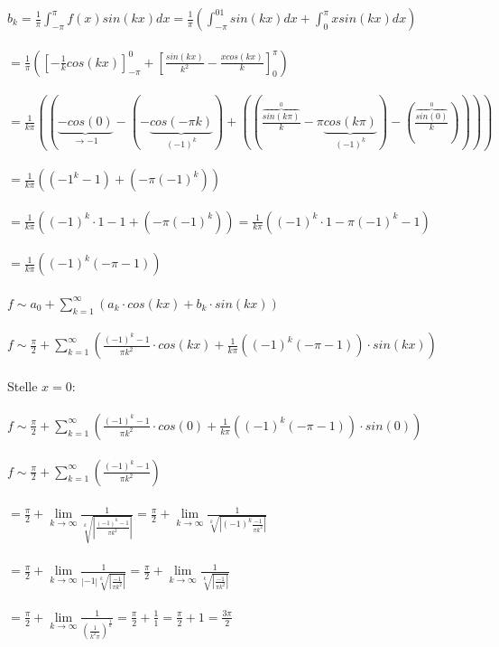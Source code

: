 \documentclass[12pt,a4paper]{article}
\begin{document}
$b_k=\frac{1}{\pi}\int_{-\pi}^\pi f(x)sin(kx)dx = \frac{1}{\pi}(\int_{-\pi}^01sin(kx)dx+\int_0^\pi xsin(kx)dx)$\\
\\
$=\frac{1}{\pi}(\left[-\frac{1}{k}cos(kx)\right]_{-\pi}^0+\left[\frac{sin(kx)}{k^2}-\frac{xcos(kx)}{k}\right]_0^\pi)$\\
\\
$=\frac{1}{k\pi}((\underbrace{-cos(0)}_{\rightarrow -1}-(-\underbrace{cos(-\pi k)}_{(-1)^k})+((\frac{\overbrace{sin(k\pi)}^{0}}{k}-\pi \underbrace{cos(k\pi)}_{(-1)^k})-(\frac{\overbrace{sin(0)}^{0}}{k}))))$\\
\\
$=\frac{1}{k\pi}((-1^k-1)+(-\pi (-1)^k))$\\
\\
$=\frac{1}{k\pi}((-1)^k\cdot 1-1+(-\pi (-1)^k)) = \frac{1}{k\pi}((-1)^k\cdot 1-\pi (-1)^k-1)$\\
\\
$=\frac{1}{k\pi}((-1)^k(-\pi-1))$\\
\\
$f\sim a_0+\sum_{k=1}^\infty(a_k\cdot cos(kx)+b_k\cdot sin(kx))$\\
\\
$f\sim \frac{\pi}{2}+\sum_{k=1}^\infty(\frac{(-1)^k-1}{\pi k^2}\cdot cos(kx)+\frac{1}{k\pi}((-1)^k(-\pi-1))\cdot sin(kx))$\\
\\
Stelle $x=0:$\\
\\
$f\sim \frac{\pi}{2}+\sum_{k=1}^\infty(\frac{(-1)^k-1}{\pi k^2}\cdot cos(0)+\frac{1}{k\pi}((-1)^k(-\pi-1))\cdot sin(0))$\\
\\
$f\sim \frac{\pi}{2}+\sum_{k=1}^\infty(\frac{(-1)^k-1}{\pi k^2})$\\
\\
$= \frac{\pi}{2}+\lim \limits_{k\rightarrow \infty}\frac{1}{\sqrt[k]{|\frac{(-1)^k-1}{\pi k^2}|}}= \frac{\pi}{2}+\lim \limits_{k\rightarrow \infty}\frac{1}{\sqrt[k]{|(-1)^k\frac{-1}{\pi k^2}|}}$\\
\\
$= \frac{\pi}{2}+\lim \limits_{k\rightarrow \infty}\frac{1}{|-1|\sqrt[k]{|\frac{-1}{\pi k^2}|}}= \frac{\pi}{2}+\lim \limits_{k\rightarrow \infty}\frac{1}{\sqrt[k]{|\frac{-1}{\pi k^2}|}}$\\
\\
$= \frac{\pi}{2}+\lim \limits_{k\rightarrow \infty}\frac{1}{(\frac{1}{k^2\pi})^{\frac{1}{k}}} = \frac{\pi}{2}+\frac{1}{1} = \frac{\pi}{2}+1=\frac{3\pi}{2}$\\
\\
\end{document}
